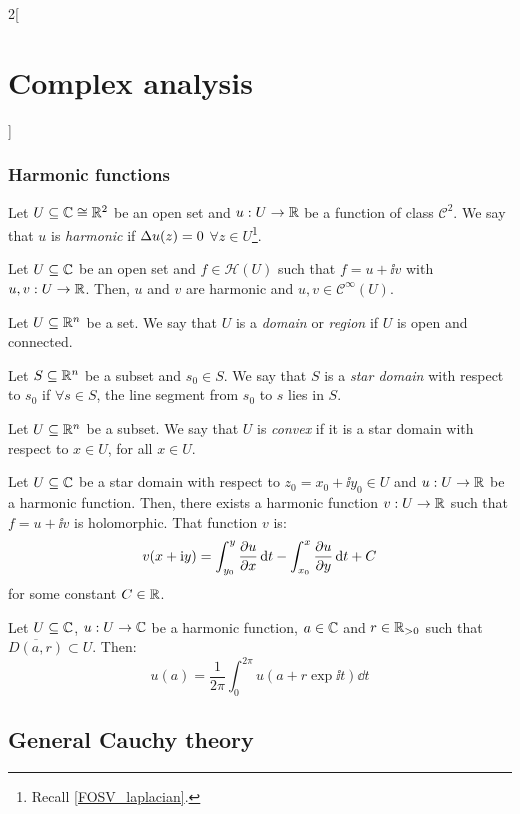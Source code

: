 \documentclass[../../../main.tex]{subfiles}
\begin{document}
\begin{multicols}{2}[\section{Complex analysis}]
  \subsubsection{Harmonic functions}
  \begin{definition}
    Let $U\subseteq \mathbb{C}\cong\mathbb{R}^2$ be an open set and $u:U\rightarrow \mathbb{R}$ be a function of class $\mathcal{C}^2$. We say that $u$ is \emph{harmonic} if $\Delta u(z)=0$ $\forall z\in U$\footnote{Recall \cref{FOSV_laplacian}.}.
  \end{definition}
  \begin{proposition}
    Let $U\subseteq \mathbb{C}$ be an open set and $f\in\mathcal{H}(U)$ such that $f=u+\ii v$ with $u,v:U\rightarrow\mathbb{R}$. Then, $u$ and $v$ are harmonic and $u,v\in\mathcal{C}^\infty(U)$.
  \end{proposition}
  \begin{definition}
    Let $U\subseteq\mathbb{R}^n$ be a set. We say that $U$ is a \emph{domain} or \emph{region} if $U$ is open and connected.
  \end{definition}
  \begin{definition}
    Let $S\subseteq\mathbb{R}^n$ be a subset and $s_0\in S$. We say that $S$ is a \emph{star domain} with respect to $s_0$ if $\forall s\in S$, the line segment from $s_0$ to $s$ lies in $S$.
  \end{definition}
  \begin{definition}
    Let $U\subseteq\mathbb{R}^n$ be a subset. We say that $U$ is \emph{convex} if it is a star domain with respect to $x\in U$, for all $x\in U$.
  \end{definition}
  \begin{proposition}
    Let $U\subseteq \mathbb{C}$ be a star domain with respect to $z_0=x_0+\ii y_0\in U$ and $u:U\rightarrow\mathbb{R}$ be a harmonic function. Then, there exists a harmonic function $v:U\rightarrow\mathbb{R}$ such that $f=u+\ii v$ is holomorphic. That function $v$ is:
    $$v(x+\mathrm{i} y)=\int_{y_0}^y\pdv{u}{x}(x+\mathrm{i} t)\dd{t}-\int_{x_0}^x\pdv{u}{y}(t+\mathrm{i} y_0)\dd{t}+C$$
    for some constant $C\in\mathbb{R}$.
  \end{proposition}
  \begin{theorem}
    Let $U\subseteq\mathbb{C}$, $u:U\rightarrow\mathbb{C}$ be a harmonic function, $a\in\mathbb{C}$ and $r\in\mathbb{R}_{>0}$ such that $\overline{D(a,r)}\subset U$. Then:
    $$u(a)=\frac{1}{2\pi}\int_0^{2\pi}u(a+r\exp{\ii t})\dd{t}$$
  \end{theorem}
  \subsection{General Cauchy theory}

\end{multicols}
\end{document}
